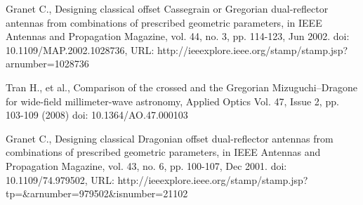 \documentclass[11pt,a4paper]{article}
\begin{document}
%
\clearpage
\newpage
\begin{thebibliography}{99}
	
	 Granet C., Designing classical offset Cassegrain or Gregorian dual-reflector antennas from combinations of prescribed geometric parameters, 
	in IEEE Antennas and Propagation Magazine, vol. 44, no. 3, pp. 114-123, Jun 2002.
	doi: 10.1109/MAP.2002.1028736,
	URL: http://ieeexplore.ieee.org/stamp/stamp.jsp?arnumber=1028736

	 Tran H., et al., Comparison of the crossed and the Gregorian Mizuguchi–Dragone for wide-field millimeter-wave astronomy, Applied Optics Vol. 47, Issue 2, pp. 103-109 (2008)  doi: 10.1364/AO.47.000103
	
	 Granet C., Designing classical Dragonian offset dual-reflector antennas from combinations of prescribed geometric parameters, 
	in IEEE Antennas and Propagation Magazine, vol. 43, no. 6, pp. 100-107, Dec 2001.
	doi: 10.1109/74.979502,
	URL: http://ieeexplore.ieee.org/stamp/stamp.jsp?tp=\&arnumber=979502\&isnumber=21102
	
	
	
	
	
	
	
\end{thebibliography}
\end{document}
